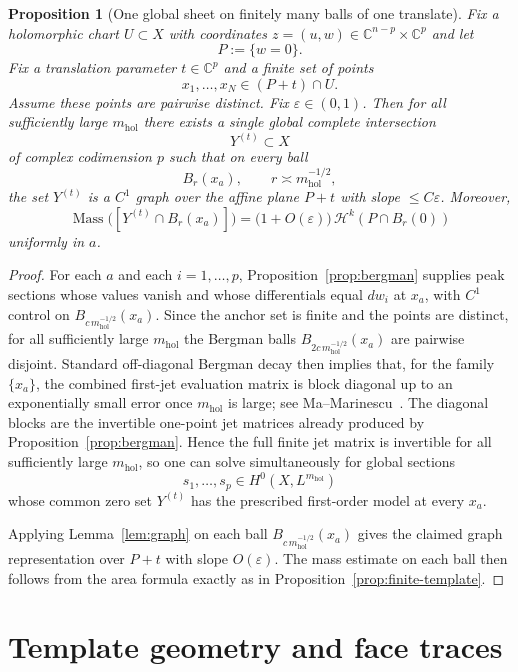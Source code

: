 \documentclass[11pt]{article}
\numberwithin{equation}{section}
\theoremstyle{plain}
\newtheorem{proposition}[theorem]{Proposition}
\theoremstyle{definition}
\theoremstyle{remark}
\DeclareMathOperator{\Mass}{Mass}
\newcommand{\C}{\mathbb{C}}
\newcommand{\eps}{\varepsilon}
\newcommand{\mhol}{m_{\mathrm{hol}}}
\newcommand{\calH}{\mathcal{H}}
\begin{document}
\begin{proposition}[One global sheet on finitely many balls of one translate]\label{prop:multi-ball}
Fix a holomorphic chart $U\subset X$ with coordinates $z=(u,w)\in\C^{n-p}\times\C^p$ and let
\[
P:=\{w=0\}.
\]
Fix a translation parameter $t\in\C^p$ and a finite set of points
\[
x_1,\dots,x_N\in (P+t)\cap U.
\]
Assume these points are pairwise distinct.
Fix $\eps\in(0,1)$.  Then for all sufficiently large $\mhol$ there exists a single global complete intersection
\[
Y^{(t)}\subset X
\]
of complex codimension $p$ such that on every ball
\[
B_r(x_a),
\qquad
r\asymp \mhol^{-1/2},
\]
the set $Y^{(t)}$ is a $C^1$ graph over the affine plane $P+t$ with slope $\le C\eps$.  Moreover,
\[
\Mass\bigl([Y^{(t)}\cap B_r(x_a)]\bigr)
=
\bigl(1+O(\eps)\bigr)\,\calH^k(P\cap B_r(0))
\]
uniformly in $a$.
\end{proposition}

\begin{proof}
For each $a$ and each $i=1,\dots,p$, Proposition~\ref{prop:bergman} supplies
peak sections whose values vanish and whose differentials equal $dw_i$ at $x_a$,
with $C^1$ control on $B_{c\,\mhol^{-1/2}}(x_a)$.  Since the anchor set is finite
and the points are distinct, for all sufficiently large $\mhol$ the Bergman balls
$B_{2c\,\mhol^{-1/2}}(x_a)$ are pairwise disjoint.  Standard off-diagonal Bergman
decay then implies that, for the family $\{x_a\}$, the combined first-jet evaluation
matrix is block diagonal up to an exponentially small error once $\mhol$ is large;
see Ma--Marinescu~\cite{MaMarinescu07,MaMarinescu13OffDiag}.  The diagonal blocks
are the invertible one-point jet matrices already produced by Proposition~\ref{prop:bergman}.
Hence the full finite jet matrix is invertible for all sufficiently large $\mhol$,
so one can solve simultaneously for global sections
\[
s_1,\dots,s_p\in H^0(X,L^{\mhol})
\]
whose common zero set $Y^{(t)}$ has the prescribed first-order model at every $x_a$.

Applying Lemma~\ref{lem:graph} on each ball $B_{c\,\mhol^{-1/2}}(x_a)$ gives the claimed graph representation over $P+t$ with slope $O(\eps)$.  The mass estimate on each ball then follows from the area formula exactly as in Proposition~\ref{prop:finite-template}.
\end{proof}

\section{Template geometry and face traces}
\end{document}
